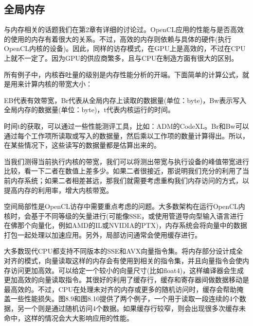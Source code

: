 \subsection{全局内存}

与内存相关的话题我们在第2章有详细的讨论过。OpenCL应用的性能与是否高效的使用的内存有着很大的关系。不过，高效的内存则依赖与具体的硬件(执行OpenCL内核的设备)。因此，同样的访存模式，在GPU上是高效的，不过在CPU上就不一定了。因为GPU的供应商繁多，且与CPU在制造方面有很大的区别。

所有例子中，内核吞吐量的级别是内存性能分析的开端。下面简单的计算公式，就是用来计算内核的带宽大小：


EB代表有效带宽，Br代表从全局内存上读取的数据量(单位：byte)，Bw表示写入全局内存的数据量(单位：byte)，t代表内核运行的时间。

时间t的获取，可以通过一些性能测评工具，比如：ADM的CodeXL。Br和Bw可以通过每个工作项所读取或写入的数据量，然后乘以工作项的数量计算得出。所以，在某些情况下，这些读写的数据量都是估算出来的。

当我们测得当前执行内核的带宽，我们可以将测出带宽与执行设备的峰值带宽进行比较，看一下二者在数值上差多少。如果二者很接近，那说明我们充分的利用了当前内存系统；如果二者相差甚远，那我们就需要考虑重构我们内存访问的方式，以提高内存的利用率，增大内核带宽。

空间局部性是OpenCL访存中需要重点考虑的问题。大多数架构在运行OpenCL内核时，会基于不同等级的矢量进行(可能像SSE，或使用管道导向型输入语言进行在佛那个向量化，例如AMD的IL或NVIDIA的PTX)，内存系统会将向量中的数据打包一起处理以加速应用。另外，局部访问通常会使用缓存进行。

大多数现代CPU都支持不同版本的SSE和AVX向量指令集。将内存部分设计成全对齐的模式，向量读取这样的内存会有使用到相关的指令集，并且向量指令会使内存访问更加高效。可以给定一个较小的向量尺寸(比如float4)，这样编译器会生成更加高效的向量读取指令。其很好的利用了缓存行，缓存和寄存器间做数据移动是最高效的。不过，CPU在处理未对齐的内存或更多的随机访问时，缓存会帮助掩盖一些性能损失。图8.9和图8.10提供了两个例子，一个用于读取一段连续的4个数据，另一个则是通过随机访问4个数据。如果缓存行较窄，则会出现很多次缓存未命中，这样的情况会大大影响应用的性能。



